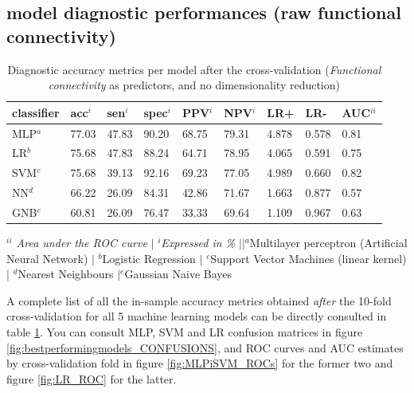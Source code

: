 \documentclass[a4paper,12pt]{elsarticle}  %
\begin{document}
		\subsection{model diagnostic performances (raw functional connectivity)} 
		\begin{table}[h]
		\centering
			\begin{threeparttable}
				\caption{Diagnostic accuracy metrics per model after the cross-validation (\textit{Functional connectivity} as predictors, and no dimensionality reduction)}
				\label{table:taula_diagnostic_metrics_fMRI_nodimreduc}
				\begin{tabular}{lllllllll}	
					\toprule
					classifier&acc$^{i}$&sen$^{i}$&spec$^{i}$&PPV$^{i}$&NPV$^{i}$&LR+&LR-&AUC$^{ii}$\\
					\midrule
					
					MLP$^{a}$ & 77.03 & 47.83 & 90.20 & 68.75 & 79.31 & 4.878 & 0.578 & 0.81\\
					LR$^{b}$ & 75.68 & 47.83 & 88.24 & 64.71 & 78.95 & 4.065 & 0.591 & 0.75\\
					SVM$^{c}$ & 75.68 & 39.13 & 92.16 & 69.23 & 77.05 & 4.989 & 0.660& 0.82\\
					NN$^{d}$ & 66.22 & 26.09 & 84.31 & 42.86 & 71.67 & 1.663 & 0.877 & 0.57\\
					GNB$^{e}$ & 60.81 & 26.09 & 76.47 & 33.33 & 69.64 & 1.109 & 0.967 & 0.63\\
					\bottomrule
				\end{tabular}
				\begin{tablenotes}
					\tiny\item[]{\textit{$^{ii}$ Area under the ROC curve} $|$ \textit{$^{i}$Expressed in \% $||$}$^{a}$Multilayer perceptron (Artificial Neural Network) $|$ $^{b}$Logistic Regression $|$ $^{c}$Support Vector Machines (linear kernel)$|$ $^{d}$Nearest Neighbours $|$$^{e}$Gaussian Naive Bayes}
				\end{tablenotes}

			\end{threeparttable}
		\end{table}
		
		\FloatBarrier
		
		
		A complete list of all the in-sample accuracy metrics obtained \textit{after} the 10-fold cross-validation for all 5 machine learning models can be directly consulted in table \ref{table:taula_diagnostic_metrics_fMRI_nodimreduc}. You can consult MLP, SVM and LR confusion matrices in figure \ref{fig:bestperformingmodels_CONFUSIONS}, and ROC curves and AUC estimates by cross-validation fold in figure \ref{fig:MLPiSVM_ROCs} for the former two and figure \ref{fig:LR_ROC} for the latter.
\end{document}
